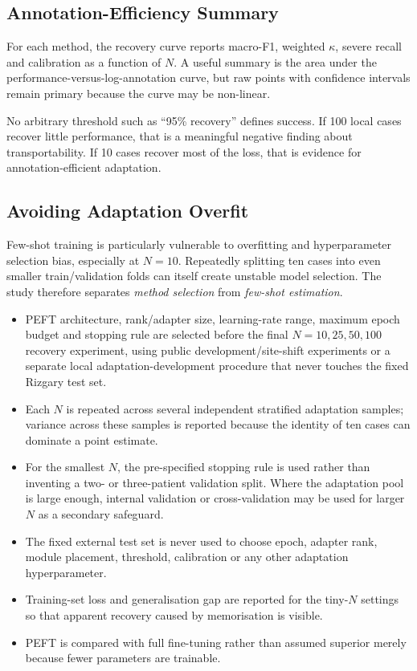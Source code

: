 \subsection{Annotation-Efficiency Summary}
\label{sec:method-annotation-efficiency}

For each method, the recovery curve reports macro-F1, weighted $\kappa$, severe
recall and calibration as a function of $N$. A useful summary is the area under
the performance-versus-log-annotation curve, but raw points with confidence
intervals remain primary because the curve may be non-linear.

No arbitrary threshold such as ``95\% recovery'' defines success. If 100 local
cases recover little performance, that is a meaningful negative finding about
transportability. If 10 cases recover most of the loss, that is evidence for
annotation-efficient adaptation.

\subsection{Avoiding Adaptation Overfit}
\label{sec:method-adaptation-overfit}

Few-shot training is particularly vulnerable to overfitting and hyperparameter
selection bias, especially at $N=10$. Repeatedly splitting ten cases into even
smaller train/validation folds can itself create unstable model selection. The
study therefore separates \emph{method selection} from \emph{few-shot
estimation}.

\begin{itemize}
  \item PEFT architecture, rank/adapter size, learning-rate range, maximum epoch
        budget and stopping rule are selected before the final $N=10,25,50,100$
        recovery experiment, using public development/site-shift experiments or
        a separate local adaptation-development procedure that never touches the
        fixed Rizgary test set.
  \item Each $N$ is repeated across several independent stratified adaptation
        samples; variance across these samples is reported because the identity
        of ten cases can dominate a point estimate.
  \item For the smallest $N$, the pre-specified stopping rule is used rather than
        inventing a two- or three-patient validation split. Where the adaptation
        pool is large enough, internal validation or cross-validation may be used
        for larger $N$ as a secondary safeguard.
  \item The fixed external test set is never used to choose epoch, adapter rank,
        module placement, threshold, calibration or any other adaptation
        hyperparameter.
  \item Training-set loss and generalisation gap are reported for the tiny-$N$
        settings so that apparent recovery caused by memorisation is visible.
  \item PEFT is compared with full fine-tuning rather than assumed superior
        merely because fewer parameters are trainable.
\end{itemize}

